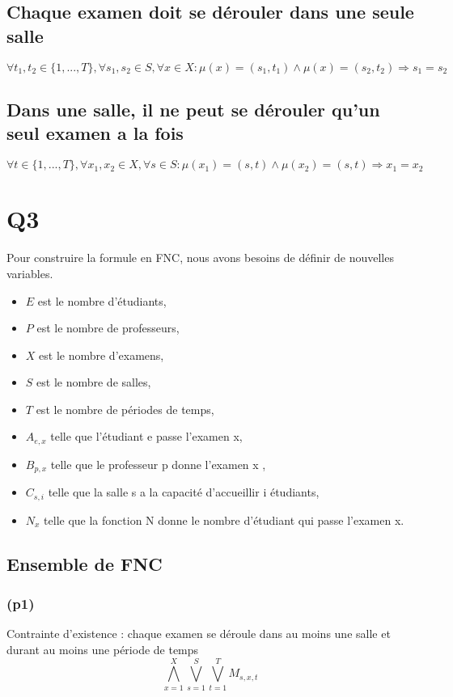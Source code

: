 \documentclass[a4paper,11pt]{article}
\begin{document}
\subsection {Chaque examen doit se dérouler dans une seule salle}
\begin{displaymath}
\forall t_{1}, t_{2} \in \{1,...,T\},\forall s_{1},s_{2} \in S, \forall x \in X : \mu(x) = (s_{1},t_{1}) \wedge \mu(x) = (s_{2},t_{2}) \Rightarrow s_{1} = s_{2}
\end{displaymath}

\subsection {Dans une salle, il ne peut se dérouler qu'un seul examen a la fois}
\begin{displaymath}
\forall t \in \{1,...,T\},\forall x_{1},x_{2} \in X, \forall s \in S : \mu(x_{1}) = (s,t) \wedge \mu(x_{2}) = (s,t) \Rightarrow x_{1} = x_{2}
\end{displaymath}	

\section{Q3}
Pour construire la formule en FNC, nous avons besoins de définir de nouvelles variables.
\begin{itemize}
    \item \(E\) est le nombre d'étudiants,
    \item \(P\) est le nombre de professeurs,
    \item \(X\) est le nombre d'examens,
    \item \(S\) est le nombre de salles,
    \item \(T\) est le nombre de périodes de temps,
	\item \( A_{e,x}\) telle que l'étudiant e passe l'examen x,
	\item \(B_{p,x}\) telle que le professeur p donne l'examen x ,
	\item \(C_{s,i}\) telle que la salle s a la capacité d'accueillir i étudiants,
	\item \(N_{x}\) telle que la fonction N donne le nombre d'étudiant qui passe l'examen x.
\end{itemize}


\subsection{Ensemble de FNC}
\subsubsection{(p1)}
Contrainte d'existence : chaque examen se déroule dans au moins une salle et durant au moins une période de temps
\begin{displaymath}
	\bigwedge\limits_{x=1}^{X}\bigvee\limits_{s=1}^{S}\bigvee\limits_{t=1}^{T} M_{s,x,t}
\end{displaymath}
\end{document}
